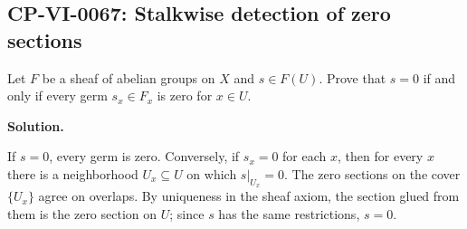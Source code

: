 
\subsection*{CP-VI-0067: Stalkwise detection of zero sections}

Let $F$ be a sheaf of abelian groups on $X$ and $s\in F(U)$. Prove that $s=0$ if and only if every germ $s_x\in F_x$ is zero for $x\in U$.

\medskip
\noindent\textbf{Solution.}

If $s=0$, every germ is zero. Conversely, if $s_x=0$ for each $x$, then for every $x$ there is a neighborhood $U_x\subseteq U$ on which $s|_{U_x}=0$. The zero sections on the cover $\{U_x\}$ agree on overlaps. By uniqueness in the sheaf axiom, the section glued from them is the zero section on $U$; since $s$ has the same restrictions, $s=0$.
